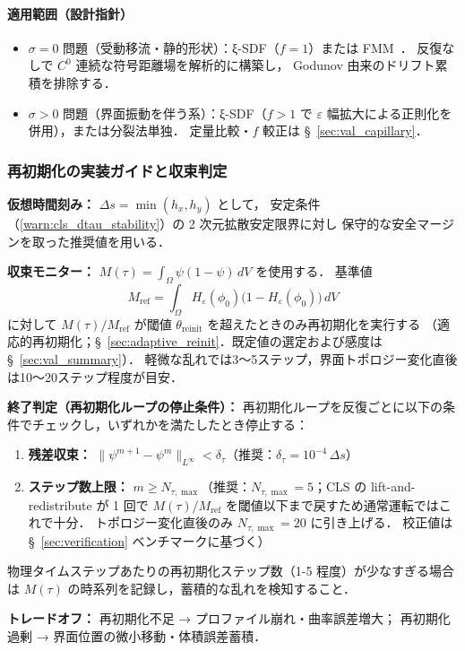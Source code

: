 \paragraph*{適用範囲（設計指針）}
\begin{itemize}
  \item $\sigma=0$ 問題（受動移流・静的形状）：ξ-SDF（$f{=}1$）または FMM~\cite{Sethian1996}．
        反復なしで $C^0$ 連続な符号距離場を解析的に構築し，
        Godunov 由来のドリフト累積を排除する．
  \item $\sigma>0$ 問題（界面振動を伴う系）：ξ-SDF（$f>1$ で
        $\varepsilon$ 幅拡大による正則化を併用），または分裂法単独．
        定量比較・$f$ 較正は §~\ref{sec:val_capillary}．
\end{itemize}

\subsubsection{再初期化の実装ガイドと収束判定}

\begin{tcolorbox}[mybox, title={実装ガイド：再初期化の定量的運用}]
\textbf{仮想時間刻み：} $\Delta s = \min(h_x, h_y)$ として，
安定条件（\ref{warn:cls_dtau_stability}）の 2 次元拡散安定限界に対し
保守的な安全マージンを取った推奨値を用いる．

\medskip
\noindent\textbf{収束モニター：} $M(\tau) = \int_\Omega \psi(1-\psi)\,dV$ を使用する．
基準値
\begin{equation}
  M_{\mathrm{ref}} = \int_\Omega H_\varepsilon(\phi_0)\bigl(1-H_\varepsilon(\phi_0)\bigr)\,dV
\end{equation}
に対して $M(\tau)/M_{\mathrm{ref}}$ が閾値 $\theta_{\mathrm{reinit}}$ を超えたときのみ再初期化を実行する
（適応的再初期化；§~\ref{sec:adaptive_reinit}．既定値の選定および感度は §~\ref{sec:val_summary}）．
軽微な乱れでは3～5ステップ，界面トポロジー変化直後は10～20ステップ程度が目安．

\medskip
\noindent\textbf{終了判定（再初期化ループの停止条件）：}
再初期化ループを反復ごとに以下の条件でチェックし，いずれかを満たしたとき停止する：
\begin{enumerate}
  \item \textbf{残差収束：}
        $\|\psi^{m+1} - \psi^m\|_{L^\infty} < \delta_{\tau}$（推奨：$\delta_\tau = 10^{-4}\,\Delta s$）
  \item \textbf{ステップ数上限：}
        $m \ge N_{\tau,\max}$（推奨：$N_{\tau,\max} = 5$；CLS の lift-and-redistribute が
        1 回で $M(\tau)/M_{\mathrm{ref}}$ を閾値以下まで戻すため通常運転ではこれで十分．
        トポロジー変化直後のみ $N_{\tau,\max} = 20$ に引き上げる．
        校正値は §~\ref{sec:verification} ベンチマークに基づく）
\end{enumerate}
物理タイムステップあたりの再初期化ステップ数（1-5 程度）が少なすぎる場合は
$M(\tau)$ の時系列を記録し，蓄積的な乱れを検知すること．

\noindent\textbf{トレードオフ：}
再初期化不足 → プロファイル崩れ・曲率誤差増大；
再初期化過剰 → 界面位置の微小移動・体積誤差蓄積．
\end{tcolorbox}

